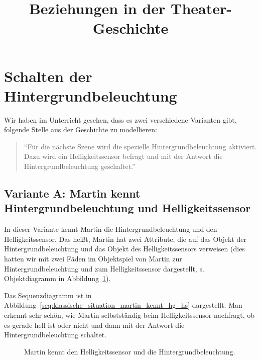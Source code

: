 \documentclass[11pt, a4paper]{scrartcl}
\title{Beziehungen in der Theater-Geschichte}
\begin{document}

\section*{Schalten der Hintergrundbeleuchtung}

Wir haben im Unterricht gesehen, dass es zwei verschiedene Varianten gibt, folgende Stelle aus der Geschichte zu modellieren:
\begin{quote}
\enquote{Für die nächste Szene wird die spezielle Hintergrundbeleuchtung aktiviert. Dazu wird ein Helligkeitssensor befragt und mit der Antwort die Hintergrundbeleuchtung geschaltet.}
\end{quote}

\subsection*{Variante A: Martin kennt Hintergrundbeleuchtung und Helligkeitssensor}

In dieser Variante kennt Martin die Hintergrundbeleuchtung und den Helligkeitssensor. Das heißt, Martin hat zwei Attribute, die auf das Objekt der Hintergrundbeleuchtung und das Objekt des Helligkeitssensors verweisen (dies hatten wir mit zwei Fäden im Objektspiel von Martin zur Hintergrundbeleuchtung und zum Helligkeitssensor dargestellt, s. Objektdiagramm in Abbildung~\ref{fig:martin_kennt_hg_hs}). 

Das Sequenzdiagramm ist in Abbildung~\ref{seq:klassische_situation_martin_kennt_hg_hs} dargestellt. Man erkennt sehr schön, wie Martin selbstständig beim Helligkeitssensor nachfragt, ob es gerade hell ist oder nicht und dann mit der Antwort die Hintergrundbeleuchtung schaltet.


\hfill
\begin{figure}[H]
\centering
{}
\caption{Martin kennt den Helligkeitssensor und die Hintergrundbeleuchtung.}
\label{fig:martin_kennt_hg_hs}
\end{figure}
\end{document}
